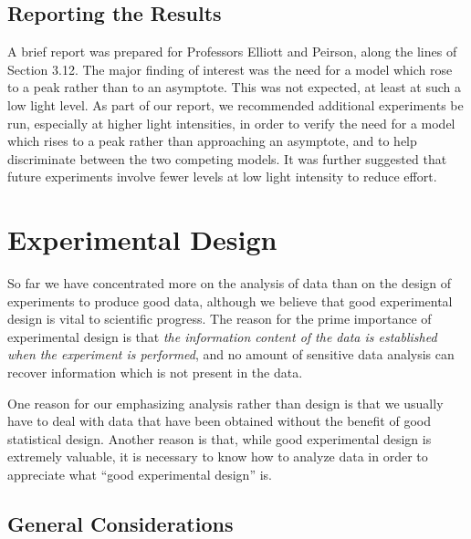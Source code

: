 \subsection{Reporting the Results}

A brief report was prepared for Professors Elliott and
Peirson, along the lines of Section 3.12.
The major finding of interest was the need for a model which rose
to a peak rather than to an asymptote.
This was not expected, at least at such a low light level.
As part of our report, we recommended additional experiments be
run, especially at higher light intensities, in order to verify
the need for a model which rises to a peak rather than approaching an
asymptote, and to help discriminate between the two competing models.
It was further suggested that future experiments involve fewer
levels at low light intensity to reduce effort.

\section{Experimental Design}

So far we have concentrated more on the analysis of data
than on the design of experiments to produce good data, although
we believe that good experimental design is vital to
scientific progress.
The reason for the prime importance of experimental design is
that \emph{the information content of the data is established
when the experiment is performed}, and no amount of sensitive data
analysis can recover information which is not present in the
data.

One reason for our emphasizing analysis rather than design is
that we usually have to deal with data that have been
obtained without the benefit of good statistical design.
Another reason is that, while good experimental design is
extremely valuable, it is necessary to know how to analyze data
in order to appreciate what ``good experimental design'' is.

\subsection{General Considerations}

